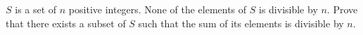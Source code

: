 $S$ is a set of $n$ positive integers. None of the elements of $S$ is divisible by $n$. Prove that there exists a subset of $S$ such that the sum of its elements is divisible by $n$.
